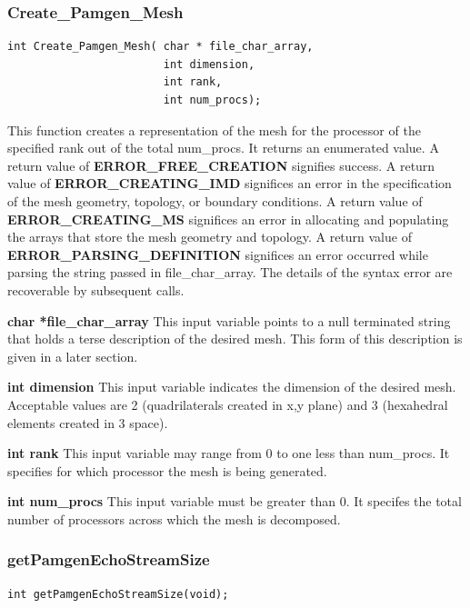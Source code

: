 \subsubsection{Create\_Pamgen\_Mesh}
{\ttfamily  \begin{verbatim}
int Create_Pamgen_Mesh( char * file_char_array,
                        int dimension,
                        int rank,
                        int num_procs);
\end{verbatim}}
This function creates a representation of the mesh for the processor of the specified rank out of the total num\_procs. It returns an enumerated value. A return value of \textbf{ERROR\_FREE\_CREATION
} signifies success. A return value of \textbf{ERROR\_CREATING\_IMD} significes an error in the specification of the mesh geometry, topology, or boundary conditions. A return value of \textbf{ERROR\_CREATING\_MS} significes an error in allocating and populating the arrays that store the mesh geometry and topology. A return value of \textbf{ERROR\_PARSING\_DEFINITION} significes an error occurred while parsing the string passed in file\_char\_array. The details of the syntax error are recoverable by subsequent calls.

{
\setlength{\parindent}{0pt}

 \textbf{char *file\_char\_array}
This input variable points to a null terminated string that holds a terse description of the desired mesh.  This form of this description is given in a later section.

 \textbf{int dimension}
This input variable indicates the dimension of the desired mesh. Acceptable values are 2 (quadrilaterals created in x,y plane) and 3 (hexahedral elements created in 3 space).

 \textbf{int rank}
This input variable may range from 0 to one less than num\_procs. It specifies for which processor the mesh is being generated.

 \textbf{int num\_procs}
This input variable must be greater than 0.  It specifes the total number of processors across which the mesh is decomposed.
}
\subsubsection{getPamgenEchoStreamSize}
{\ttfamily  \begin{verbatim}
int getPamgenEchoStreamSize(void);
\end{verbatim}}

